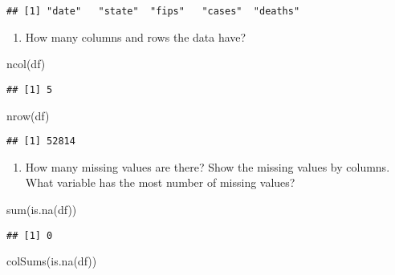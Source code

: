 \documentclass[
]{article}
\newenvironment{Shaded}{\begin{snugshade}}{\end{snugshade}}
\newcommand{\FunctionTok}[1]{\textcolor[rgb]{0.00,0.00,0.00}{#1}}
\newcommand{\NormalTok}[1]{#1}
\providecommand{\tightlist}{%
  \setlength{\itemsep}{0pt}\setlength{\parskip}{0pt}}
\begin{document}
\begin{verbatim}
## [1] "date"   "state"  "fips"   "cases"  "deaths"
\end{verbatim}

\begin{enumerate}
\def\labelenumi{\arabic{enumi}.}
\setcounter{enumi}{2}
\tightlist
\item
  How many columns and rows the data have?
\end{enumerate}

\begin{Shaded}
\begin{Highlighting}[]
\FunctionTok{ncol}\NormalTok{(df)}
\end{Highlighting}
\end{Shaded}

\begin{verbatim}
## [1] 5
\end{verbatim}

\begin{Shaded}
\begin{Highlighting}[]
\FunctionTok{nrow}\NormalTok{(df)}
\end{Highlighting}
\end{Shaded}

\begin{verbatim}
## [1] 52814
\end{verbatim}

\begin{enumerate}
\def\labelenumi{\arabic{enumi}.}
\setcounter{enumi}{3}
\tightlist
\item
  How many missing values are there? Show the missing values by columns.
  What variable has the most number of missing values?
\end{enumerate}

\begin{Shaded}
\begin{Highlighting}[]
\FunctionTok{sum}\NormalTok{(}\FunctionTok{is.na}\NormalTok{(df))}
\end{Highlighting}
\end{Shaded}

\begin{verbatim}
## [1] 0
\end{verbatim}

\begin{Shaded}
\begin{Highlighting}[]
\FunctionTok{colSums}\NormalTok{(}\FunctionTok{is.na}\NormalTok{(df))}
\end{Highlighting}
\end{Shaded}
\end{document}
